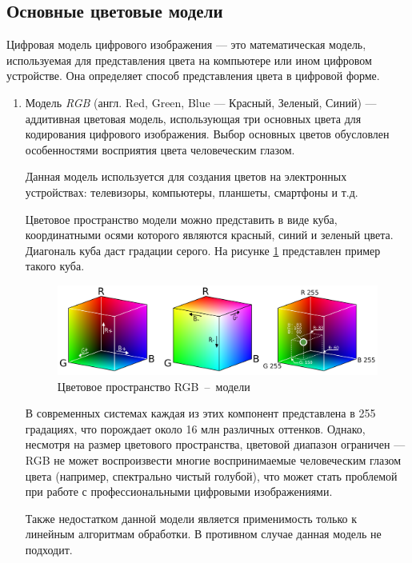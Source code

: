 
\subsection{Основные цветовые модели}

Цифровая модель цифрового изображения --- это математическая модель, используемая для представления цвета на компьютере или ином цифровом устройстве. Она определяет способ представления цвета в цифровой форме.

\begin{enumerate}
	\item Модель \textit{RGB} (англ. Red, Green, Blue --- Красный, Зеленый, Синий) --- аддитивная цветовая модель, использующая три основных цвета для кодирования цифрового изображения. Выбор основных цветов обусловлен особенностями восприятия цвета человеческим глазом. 
	
	Данная модель используется для создания цветов на электронных устройствах: телевизоры, компьютеры, планшеты, смартфоны и т.д. 
	
	Цветовое пространство модели можно представить в виде куба, координатными осями которого являются красный, синий и зеленый цвета. Диагональ куба даст градации серого. На рисунке \ref{rgb_cube} представлен пример такого куба.
	
	\begin{figure}[H]
		\centering
		\includegraphics[scale=0.55]{assets/rgb_color_cube.pdf}
		\caption{Цветовое пространство RGB~--~модели}
		\label{rgb_cube}
	\end{figure}

	В современных системах каждая из этих компонент представлена в 255 градациях, что порождает около 16 млн различных оттенков. Однако, несмотря на размер цветового пространства, цветовой диапазон ограничен --- RGB не может воспроизвести многие воспринимаемые человеческим глазом цвета (например, спектрально чистый голубой), что может стать проблемой при работе с профессиональными цифровыми изображениями.
	
	Также недостатком данной модели является применимость только к линейным алгоритмам обработки. В противном случае данная модель не подходит.
	

\end{enumerate}
